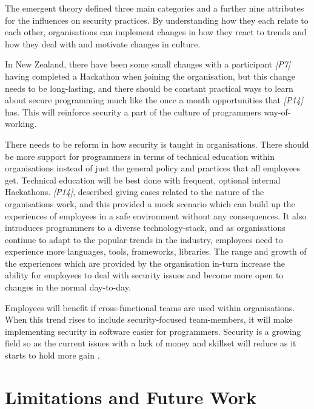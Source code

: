 The emergent theory defined three main categories and a further nine attributes for the influences on security practices. By understanding how they each relate to each other, organisations can implement changes in how they react to trends and how they deal with and motivate changes in culture. 
\newline
\par
In New Zealand, there have been some small changes with a participant \textit{[P7] } having completed a Hackathon when joining the organisation, but this change needs to be long-lasting, and there should be constant practical ways to learn about secure programming much like the once a month opportunities that \textit{[P14]} has. This will reinforce security a part of the culture of programmers way-of-working. 
 \newline
 \par
 There needs to be reform in how security is taught in organisations. There should be more support for programmers in terms of technical education within organisations instead of just the general policy and practices that all employees get. Technical education will be best done with frequent, optional internal Hackathons. \textit{[P14]}, described giving cases related to the nature of the organisations work, and this provided a mock scenario which can build up the experiences of employees in a safe environment without any consequences. It also introduces programmers to a diverse technology-stack, and as organisations continue to adapt to the popular trends in the industry, employees need to experience more languages, tools, frameworks, libraries. The range and growth of the experiences which are provided by the organisation in-turn increase the ability for employees to deal with security issues and become more open to changes in the normal day-to-day.  
 \newline
 \par
 Employees will benefit if cross-functional teams are used within organisations. When this trend rises to include security-focused team-members, it will make implementing security in software easier for programmers. Security is a growing field so as the current issues with a lack of money and skillset will reduce as it starts to hold more gain \cite{grow}. 
 

\section{Limitations and Future Work} 


